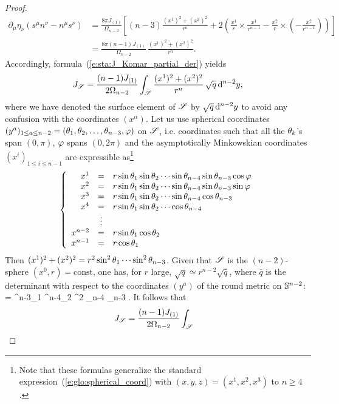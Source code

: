 \begin{proof}
\begin{align}
  \partial_\mu \eta_\nu (s^\mu n^\nu - n^\mu s^\nu) & =
   \frac{8\pi J_{(1)}}{\Omega_{n-2}} \left[
   (n-3) \frac{(x^1)^2 + (x^2)^2}{r^n} + 2 \left( \frac{x^1}{r}\times \frac{x^1}{r^{n-1}}
   - \frac{x^2}{r}\times \left(- \frac{x^2}{r^{n-1}} \right) \right) \right] \nonumber \\
   & = \frac{8\pi (n-1) J_{(1)}}{\Omega_{n-2}} \, \frac{(x^1)^2 + (x^2)^2}{r^n} . \nonumber
\end{align}
Accordingly, formula~(\ref{e:sta:J_Komar_partial_der}) yields
\[
    J_{\mathscr{S}} =  \frac{(n-1)J_{(1)}}{2\Omega_{n-2}}  \int_{\mathscr{S}}
    \frac{(x^1)^2 + (x^2)^2}{r^n} \, \sqrt{q}\, \mathrm{d}^{n-2} y ,
\]
where we have denoted the surface element of $\mathscr{S}$ by $\sqrt{q} \, \mathrm{d}^{n-2} y$
to avoid any
confusion with the coordinates $(x^\alpha)$.
Let us use spherical coordinates $(y^a)_{1\leq a \leq n-2} = (\theta_1,\theta_2,\ldots,\theta_{n-3},\varphi)$
on $\mathscr{S}$, i.e. coordinates such that all the $\theta_k$'s span $(0,\pi)$,
$\varphi$ spans $(0,2\pi)$
and the asymptotically Minkowskian coordinates
$(x^i)_{1\leq i \leq n-1}$ are expressible as\footnote{Note that these formulas generalize
the standard expression~(\ref{e:glo:spherical_coord}) with $(x,y,z)=(x^1,x^2,x^3)$ to $n\geq 4$.}
\[
    \left\{ \begin{array}{rcl}
    x^1 & = & r \sin\theta_1 \sin\theta_2 \cdots \sin \theta_{n-4} \sin \theta_{n-3} \cos\varphi \\
    x^2 & = & r \sin\theta_1 \sin\theta_2 \cdots \sin \theta_{n-4} \sin \theta_{n-3} \sin\varphi \\
    x^3 & = & r \sin\theta_1 \sin\theta_2 \cdots \sin \theta_{n-4} \cos \theta_{n-3} \\
    x^4 & = & r \sin\theta_1 \sin\theta_2 \cdots \cos \theta_{n-4} \\
     &\vdots & \\
    x^{n-2} & = & r \sin\theta_1 \cos\theta_2 \\
    x^{n-1} & = & r \cos\theta _1
     \end{array} \right .
\]
Then $(x^1)^2 + (x^2)^2 = r^2 \sin^2\theta_1 \cdots \sin^2 \theta_{n-3}$.
Given that $\mathscr{S}$ is the $(n-2)$-sphere $(x^0,r) = \mathrm{const}$, one has,
for $r$ large, $\sqrt{q} \simeq r^{n-2} \sqrt{\bar{q}}$,
where $\bar{q}$ is the determinant with respect to the coordinates
$(y^a)$ of the round metric on $\mathbb{S}^{n-2}$:
\be \label{e:sta:sqrt_barq_spher}
  = \sin^{n-3}\th_1 \sin^{n-4}\th_2 \cdots \sin^2 \th_{n-4} \sin \th_{n-3} .
\ee
It follows that
\begin{align}
    J_{\Sp} &=  \frac{(n-1)J_{(1)}}{2\Omega_{n-2}}  \int_{\Sp}

\end{align}
\end{proof}
